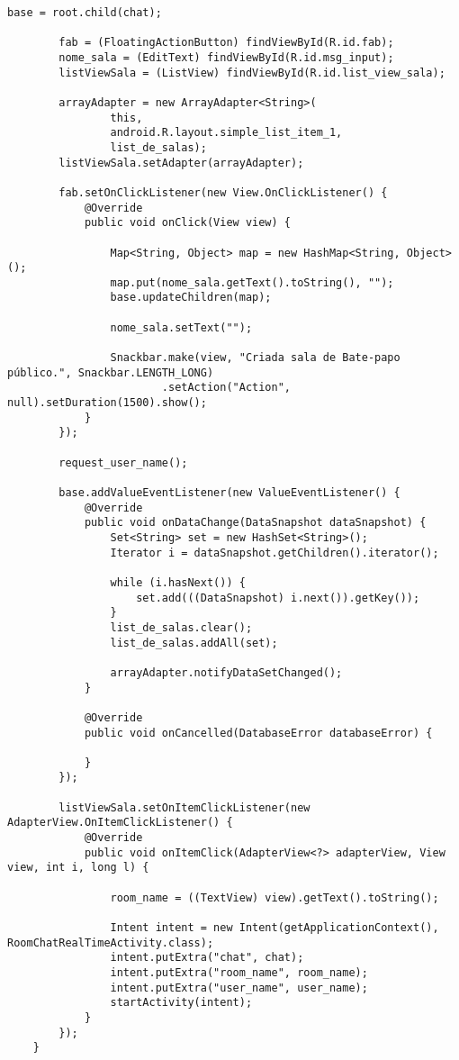 \documentclass[12pt,a4paper]{article}
\begin{document}
\begin{lstlisting}[caption=./mobile/src/main/java/app/transparenciaeducativa/ChatRealTimeActivity.java]
        base = root.child(chat);

        fab = (FloatingActionButton) findViewById(R.id.fab);
        nome_sala = (EditText) findViewById(R.id.msg_input);
        listViewSala = (ListView) findViewById(R.id.list_view_sala);

        arrayAdapter = new ArrayAdapter<String>(
                this,
                android.R.layout.simple_list_item_1,
                list_de_salas);
        listViewSala.setAdapter(arrayAdapter);

        fab.setOnClickListener(new View.OnClickListener() {
            @Override
            public void onClick(View view) {

                Map<String, Object> map = new HashMap<String, Object>();
                map.put(nome_sala.getText().toString(), "");
                base.updateChildren(map);

                nome_sala.setText("");

                Snackbar.make(view, "Criada sala de Bate-papo público.", Snackbar.LENGTH_LONG)
                        .setAction("Action", null).setDuration(1500).show();
            }
        });

        request_user_name();

        base.addValueEventListener(new ValueEventListener() {
            @Override
            public void onDataChange(DataSnapshot dataSnapshot) {
                Set<String> set = new HashSet<String>();
                Iterator i = dataSnapshot.getChildren().iterator();

                while (i.hasNext()) {
                    set.add(((DataSnapshot) i.next()).getKey());
                }
                list_de_salas.clear();
                list_de_salas.addAll(set);

                arrayAdapter.notifyDataSetChanged();
            }

            @Override
            public void onCancelled(DatabaseError databaseError) {

            }
        });

        listViewSala.setOnItemClickListener(new AdapterView.OnItemClickListener() {
            @Override
            public void onItemClick(AdapterView<?> adapterView, View view, int i, long l) {

                room_name = ((TextView) view).getText().toString();

                Intent intent = new Intent(getApplicationContext(), RoomChatRealTimeActivity.class);
                intent.putExtra("chat", chat);
                intent.putExtra("room_name", room_name);
                intent.putExtra("user_name", user_name);
                startActivity(intent);
            }
        });
    }


\end{lstlisting}
\end{document}
